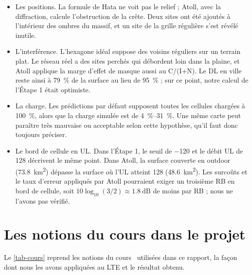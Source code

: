 \begin{itemize}
  \item Les positions. La formule de Hata ne voit pas le relief ; Atoll, avec la diffraction, calcule l'obstruction de la crête. Deux sites ont été ajoutés à l'intérieur des ombres du massif, et un site de la grille régulière s'est révélé inutile.
  \item L'interférence. L'hexagone idéal suppose des voisins réguliers sur un terrain plat. Le réseau réel a des sites perchés qui débordent loin dans la plaine, et Atoll applique la marge d'effet de masque aussi au C/(I+N). Le DL en ville reste ainsi à \SI{79}{\percent} de la surface au lieu de \SI{95}{\percent} ; sur ce point, notre calcul de l'Étape 1 était optimiste.
  \item La charge. Les prédictions par défaut supposent toutes les cellules chargées à \SI{100}{\percent}, alors que la charge simulée est de \SIrange{4}{31}{\percent}. Une même carte peut paraître très mauvaise ou acceptable selon cette hypothèse, qu'il faut donc toujours préciser.
  \item Le bord de cellule en UL. Dans l'Étape 1, le seuil de \SI{-120}{\dBm} et le débit UL de \SI{128}{\kbps} décrivent le même point. Dans Atoll, la surface couverte en outdoor (\SI{73,8}{\kilo\metre\squared}) dépasse la surface où l'UL atteint \SI{128}{\kbps} (\SI{48,6}{\kilo\metre\squared}). Les surcoûts et le taux d'erreur appliqués par Atoll pourraient exiger un troisième RB en bord de cellule, soit $10\log_{10}(3/2) \approx \SI{1,8}{\deci\bel}$ de moins par RB ; nous ne l'avons pas vérifié.
\end{itemize}

\section{Les notions du cours dans le projet}
\label{sec-cours}

Le \cref{tab-cours} reprend les notions du cours~\cite{afif2026cours} utilisées dans ce rapport, la façon dont nous les avons appliquées au LTE et le résultat obtenu.

